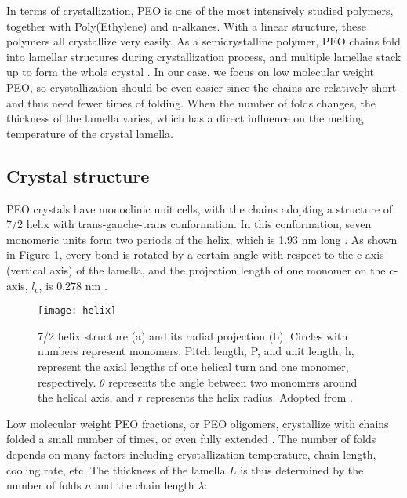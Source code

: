 In terms of crystallization, PEO is one of the most intensively studied polymers, together with Poly(Ethylene) and n-alkanes. With a linear structure, these polymers all crystallize very easily. As a semicrystalline polymer, PEO chains fold into lamellar structures during crystallization process, and multiple lamellae stack up to form the whole crystal \cite{Arlif1966}. In our case, we focus on low molecular weight PEO, so crystallization should be even easier since the chains are relatively short and thus need fewer times of folding. When the number of folds changes, the thickness of the lamella varies, which has a direct influence on the melting temperature of the crystal lamella.

\subsection{Crystal structure}

PEO crystals have monoclinic unit cells, with the chains adopting a structure of 7/2 helix with trans-gauche-trans conformation. In this conformation, seven monomeric units form two periods of the helix, which is 1.93 nm long \cite{Yoshihara1964}. As shown in Figure \ref{fig:PEOhelix}, every bond is rotated by a certain angle with respect to the c-axis (vertical axis) of the lamella, and the projection length of one monomer on the c-axis, $l_{c}$, is 0.278 nm \cite{Takahashi1973}.

\begin{figure}[H]
\center
\vspace{1 cm}
\texttt{[image: helix]}
\caption[7/2 helix structure (a) and its radial projection (b).]{7/2 helix structure (a) and its radial projection (b). Circles with numbers represent monomers. Pitch length, P, and unit length, h, represent the axial lengths of one helical turn and one monomer, respectively. $\theta$ represents the angle between two monomers around the helical axis, and $r$ represents the helix radius. Adopted from \cite{Okuyama2008}.}
\label{fig:PEOhelix}
\end{figure}

Low molecular weight PEO fractions, or PEO oligomers, crystallize with chains folded a small number of times, or even fully extended \cite{Kovacs1975,Kovacs1977}. The number of folds depends on many factors including crystallization temperature, chain length, cooling rate, etc. The thickness of the lamella $L$ is thus determined by the number of folds $n$ and the chain length $\lambda$:

